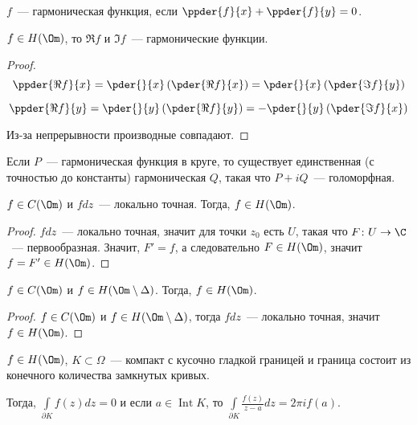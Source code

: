 \begin{definition}
    $f$~--- гармоническая функция, если
    $\ppder{f}{x} + \ppder{f}{y} = 0$.
\end{definition}

\begin{consequence}
    $f\in H(\Om)$, то $\Re f$ и $\Im f$~---
    гармонические функции.
\end{consequence}

\begin{proof}
    \[
        \ppder{\Re f}{x}
        = \pder{}{x}\left(\pder{\Re f}{x}\right)
        = \pder{}{x}\left(\pder{\Im f}{y}\right)
    \]

    \[
        \ppder{\Re f}{y}
        = \pder{}{y}\left(\pder{\Re f}{y}\right)
        = -\pder{}{y}\left(\pder{\Im f}{x}\right)
    \]

    Из-за непрерывности производные совпадают.
\end{proof}

\begin{observation}
    Если $P$~--- гармоническая функция в круге,
    то существует единственная (с точностью до константы)
    гармоническая $Q$,
    такая что $P + iQ$~--- голоморфная.
\end{observation}

\begin{theorem}[Морера]
    $f \in C(\Om)$ и $fdz$~--- локально точная.
    Тогда, $f \in H(\Om)$.
\end{theorem}

\begin{proof}
    $fdz$~--- локально точная, значит для
    точки $z_0$ есть $U$, такая что $F\colon U \to \C$~---
    первообразная. Значит, $F' = f$, а следовательно
    $F \in H(\Om)$, значит $f = F' \in H(\Om)$.
\end{proof}

\begin{consequence}
    $f \in C(\Om)$ и $f \in H(\Om \setminus \Delta)$.
    Тогда, $f \in H(\Om)$.
\end{consequence}

\begin{proof}
    $f \in C(\Om)$ и $f \in H(\Om \setminus \Delta)$,
    тогда $fdz$~--- локально точная, значит
    $f \in H(\Om)$.
\end{proof}

\begin{theorem}

    $f\in H(\Om)$, $K \subset \Omega$~--- компакт
    с кусочно гладкой границей и граница
    состоит из конечного количества замкнутых кривых.

    Тогда, $\int\limits_{\partial K} f(z)dz = 0$
    и если $a \in \operatorname{Int} K$, то
    $\int\limits_{\partial K} \frac{f(z)}{z-a}dz =
        2\pi i f(a)$.
\end{theorem}

